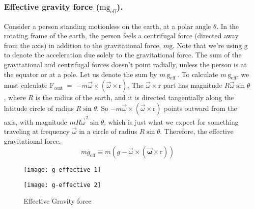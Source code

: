 \subsubsection{Effective gravity force ($\mathrm{mg}_{\mathrm{eff}}$).}
 Consider a person standing motionless on the earth, at a polar angle $\theta$. In the rotating frame of the earth, the person feels a centrifugal force (directed away from the axis) in addition to the gravitational force, $m \mathrm{g}$.   Note that we're using $\mathrm{g}$ to denote the acceleration due solely to the gravitational force. 
The sum of the gravitational and centrifugal forces doesn't point radially, unless the person is at the equator or at a pole. Let us denote the sum by $m \mathrm{~g}_{\text {eff }}$. To calculate $m \mathrm{~g}_{\mathrm{eff}}$, we must calculate $\mathrm{F}_{\text {cent }}=$ $-m \vec{\omega} \times(\vec{\omega} \times \mathrm{r})$. The $\vec{\omega} \times \mathrm{r}$ part has magnitude $R \vec{\omega} \sin \theta$, where $R$ is the radius of the earth, and it is directed tangentially along the latitude circle of radius $R \sin \theta$. So $-m \vec{\omega} \times(\vec{\omega} \times \mathrm{r})$ points outward from the axis, with magnitude $m R \vec{\omega}^{2} \sin \theta$, which is just what we expect for something traveling at frequency $\vec{\omega}$ in a circle of radius $R \sin \theta$. Therefore, the effective gravitational force,
$$
m {g}_{\mathrm{eff}} \equiv m({g}-\vec{\omega} \times(\boldsymbol{\vec{\omega}} \times \mathrm{r}))
$$
\begin{center}
\begin{figure}[H]
\begin{minipage}{0.45\textwidth}
	\texttt{[image: g-effective 1]}
\end{minipage}	\hfil
\begin{minipage}{0.45\textwidth}
	\texttt{[image: g-effective 2]}
\end{minipage}	
	\caption{Effective Gravity force}
	\label{Effective Gravity force}
\end{figure}
\end{center}
